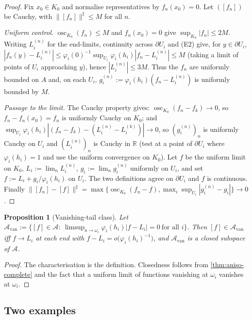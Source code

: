 \documentclass[11pt,a4paper]{article}
\numberwithin{equation}{section}
\theoremstyle{plain}
\newtheorem{proposition}[theorem]{Proposition}
\theoremstyle{definition}
\theoremstyle{remark}
\newcommand{\R}{\mathbb{R}}
\DeclareMathOperator{\osc}{osc}
\begin{document}
\begin{proof}
Fix $x_0\in K_0$ and normalise representatives by $f_n(x_0)=0$. Let $([f_n])$ be Cauchy,
with $\|[f_n]\|^{\sharp}\le M$ for all $n$.

\emph{Uniform control.} $\osc_{K_0}(f_n)\le M$ and $f_n(x_0)=0$ give
$\sup_{K_0}|f_n|\le 2M$. Writing $L^{(n)}_i$ for the end-limits, continuity across
$\partial U_i$ and (E2) give, for $y\in\partial U_i$,
$|f_n(y)-L^{(n)}_i|\le\varphi_i(0)^{-1}\sup_{U_i}\varphi_i(h_i)|f_n-L^{(n)}_i|\le M$
(taking a limit of points of $U_i$ approaching $y$), hence $|L^{(n)}_i|\le3M$. Thus the
$f_n$ are uniformly bounded on $A$ and, on each $U_i$,
$g^{(n)}_i:=\varphi_i(h_i)(f_n-L^{(n)}_i)$ is uniformly bounded by $M$.

\emph{Passage to the limit.} The Cauchy property gives:
$\osc_{K_0}(f_n-f_k)\to0$, so $f_n-f_n(x_0)=f_n$ is uniformly Cauchy on $K_0$; and
$\sup_{U_i}\varphi_i(h_i)|(f_n-f_k)-(L^{(n)}_i-L^{(k)}_i)|\to0$, so
$(g^{(n)}_i)_n$ is uniformly Cauchy on $U_i$ and $(L^{(n)}_i)_n$ is Cauchy in $\R$ (test at
a point of $\partial U_i$ where $\varphi_i(h_i)=1$ and use the uniform convergence on
$K_0$). Let $f$ be the uniform limit on $K_0$, $L_i:=\lim_nL^{(n)}_i$,
$g_i:=\lim_ng^{(n)}_i$ uniformly on $U_i$, and set $f:=L_i+g_i/\varphi_i(h_i)$ on $U_i$.
The two definitions agree on $\partial U_i$ and $f$ is continuous. Finally
$\|[f_n]-[f]\|^{\sharp}=\max\{\osc_{K_0}(f_n-f),\max_i\sup_{U_i}|g^{(n)}_i-g_i|\}\to0$.
\end{proof}

\begin{proposition}[Vanishing-tail class]\label{prop:aniso-decay}
Let $\mathcal{A}_{\mathrm{van}}:=\{[f]\in\mathcal{A}:\ \limsup_{a\to\omega_i}
\varphi_i(h_i)|f-L_i|=0\ \text{for all }i\}$. Then $[f]\in\mathcal{A}_{\mathrm{van}}$ iff
$f\to L_i$ at each end with $f-L_i=o\bigl(\varphi_i(h_i)^{-1}\bigr)$, and
$\mathcal{A}_{\mathrm{van}}$ is a closed subspace of $\mathcal{A}$.
\end{proposition}

\begin{proof}
The characterisation is the definition. Closedness follows from
\cref{thm:aniso-complete} and the fact that a uniform limit of functions vanishing at
$\omega_i$ vanishes at $\omega_i$.
\end{proof}

\subsection{Two examples}
\end{document}
